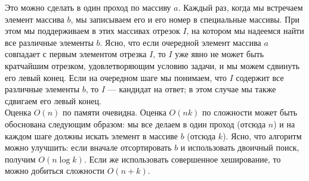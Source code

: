 \documentclass{article}
\begin{document}
Это можно сделать в один проход по массиву $a$. Каждый раз, когда мы встречаем элемент массива $b$, мы записываем его и его номер в специальные массивы. При этом мы поддерживаем в этих массивах отрезок $I$, на котором мы надеемся найти все различные элементы $b$. Ясно, что если очередной элемент массива $a$ совпадает с первым элементом отрезка $I$, то $I$ уже явно не может быть кратчайшим отрезком, удовлетворяющим условию задачи, и мы можем сдвинуть его левый конец. Если на очередном шаге мы понимаем, что $I$ содержит все различные элементы $b$, то $I$ --- кандидат на ответ; в этом случае мы также сдвигаем его левый конец.\\
Оценка $O(n)$ по памяти очевидна. Оценка $O(nk)$ по сложности может быть обоснована следующим образом: мы все делаем в один проход (отсюда $n$) и на каждом шаге должны искать элемент в массиве $b$ (отсюда $k$). Ясно, что алгоритм можно улучшить: если вначале отсортировать $b$ и использовать двоичный поиск, получим $O(n \log k)$. Если же использовать совершенное хеширование, то можно добиться сложности $O(n+k)$.
\end{document}
